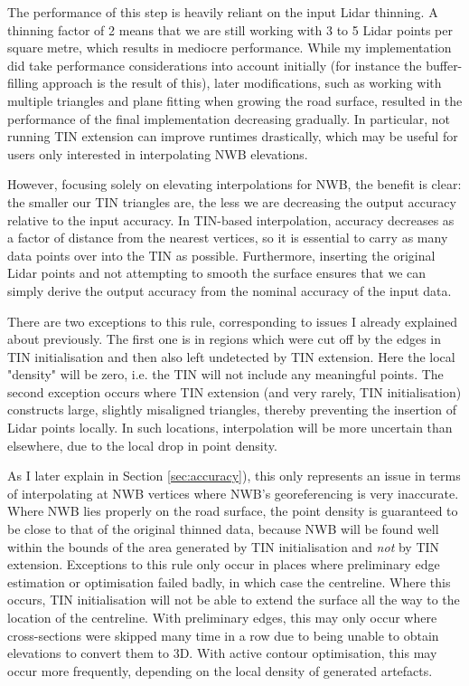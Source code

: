 The performance of this step is heavily reliant on the input Lidar thinning. A thinning factor of 2 means that we are still working with 3 to 5 Lidar points per square metre, which results in mediocre performance. While my implementation did take performance considerations into account initially (for instance the buffer-filling approach is the result of this), later modifications, such as working with multiple triangles and plane fitting when growing the road surface, resulted in the performance of the final implementation decreasing gradually. In particular, not running TIN extension can improve runtimes drastically, which may be useful for users only interested in interpolating NWB elevations.

However, focusing solely on elevating interpolations for NWB, the benefit is clear: the smaller our TIN triangles are, the less we are decreasing the output accuracy relative to the input accuracy. In TIN-based interpolation, accuracy decreases as a factor of distance from the nearest vertices, so it is essential to carry as many data points over into the TIN as possible. Furthermore, inserting the original Lidar points and not attempting to smooth the surface ensures that we can simply derive the output accuracy from the nominal accuracy of the input data.

There are two exceptions to this rule, corresponding to issues I already explained about previously. The first one is in regions which were cut off by the edges in TIN initialisation and then also left undetected by TIN extension. Here the local "density" will be zero, i.e. the TIN will not include any meaningful points. The second exception occurs where TIN extension (and very rarely, TIN initialisation) constructs large, slightly misaligned triangles, thereby preventing the insertion of Lidar points locally. In such locations, interpolation will be more uncertain than elsewhere, due to the local drop in point density.

As I later explain in Section \ref{sec:accuracy}), this only represents an issue in terms of interpolating at NWB vertices where NWB's georeferencing is very inaccurate. Where NWB lies properly on the road surface, the point density is guaranteed to be close to that of the original thinned data, because NWB will be found well within the bounds of the area generated by TIN initialisation and \textit{not} by TIN extension. Exceptions to this rule only occur in places where preliminary edge estimation or optimisation failed badly, in which case the centreline. Where this occurs, TIN initialisation will not be able to extend the surface all the way to the location of the centreline. With preliminary edges, this may only occur where cross-sections were skipped many time in a row due to being unable to obtain elevations to convert them to 3D. With active contour optimisation, this may occur more frequently, depending on the local density of generated artefacts.

